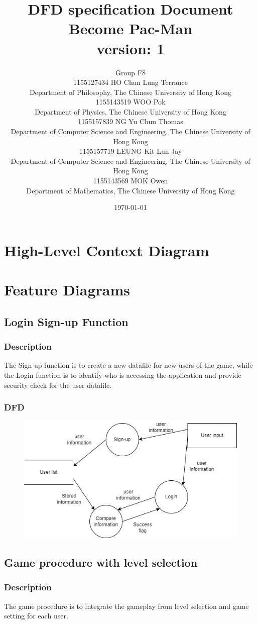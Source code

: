 \documentclass{article}
\title{DFD specification Document\\Become Pac-Man\\version: 1}
\author{Group F8\\1155127434 HO Chun Lung Terrance\\
Department of Philosophy, The Chinese University of Hong Kong\\1155143519 WOO Pok\\
Department of Physics, The Chinese University of Hong Kong\\1155157839 NG Yu Chun Thomas\\
Department of Computer Science and Engineering, The Chinese University of Hong Kong\\1155157719 LEUNG Kit Lun Jay\\
Department of Computer Science and Engineering, The Chinese University of Hong Kong\\1155143569 MOK Owen\\
Department of Mathematics, The Chinese University of Hong Kong}
\date{\today}
\begin{document}
\maketitle
\tableofcontents
\newpage

\section{High-Level Context Diagram}

\section{Feature Diagrams}
\subsection{Login Sign-up Function}
\subsubsection{Description}
\par The Sign-up function is to create a new datafile for new users of the game, while the Login function is to identify who is accessing the application and provide security check for the user datafile.
\subsubsection{DFD}
\begin{figure}[H]
    \centering
    \includegraphics*[scale=0.4]{Login_Signup_DFD.png}
\end{figure}
\subsection{Game procedure with level selection}
\subsubsection{Description}
\par The game procedure is to integrate the gameplay from level selection and game setting for each user.
\end{document}
